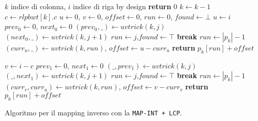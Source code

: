\begin{algorithm}
  \begin{algorithmic}[1]
    \Comment $k$ indice di colonna, $i$ indice di riga
    \Comment by design
    \State \textbf{return} $0$
    \EndIf
    \State $k\gets k-1$
    \State $c\gets rlpbwt[k].c$
    \State $u\gets 0$, $v\gets 0$, $offset\gets 0$, $run \gets 0$,
    $found\gets \bot$
    \State $u\gets i$
    \State $prev_0\gets 0$, $next_0\gets 0$
    \For {\textit{every} $j\in [0,|p_k|)$}
    \State $(prev_0,\_) \gets uvtrick(k,j)$
    \State $(next_0,\_) \gets uvtrick(k,j+1)$
    \State $run\gets j$,$found\gets \top$
    \State \textbf{break}
    \EndIf
    \EndFor
    \State $run \gets |p_k|-1$
    \EndIf
    \State $(curr_u,\_)\gets uvtrick(k, run)$, $offset\gets u-curr_u$
    \State \textbf{return} $p_k[run]+offset$
    \Else

    \State $v\gets i-c$
    \State $prev_1\gets 0$, $next_1\gets 0$
    \For {\textit{every} $j\in [0,|p_k|)$}
    \State $(\_,prev_1) \gets uvtrick(k,j)$
    \State $(\_,next_1) \gets uvtrick(k,j+1)$
    \State $run\gets j$,$found\gets \top$
    \State \textbf{break}
    \EndIf
    \EndFor
    \State $run \gets |p_k|-1$
    \EndIf
    \State $(curr_v,curr_u)\gets uvtrick(k, run)$, $offset\gets v-curr_v$
    \State \textbf{return} $p_k[run]+offset$
    \EndIf
    \EndFunction
  \end{algorithmic}
  \caption{Algoritmo per il mapping inverso con la \texttt{MAP-INT + LCP}.}
  \label{algo:lfrev}
\end{algorithm}

